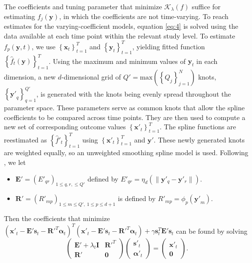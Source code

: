 \documentclass[11pt,reqno]{article}
\theoremstyle{definition}
\begin{document}
The coefficients and tuning parameter that minimize $\mathcal{K}_{\lambda}(f)$ suffice for estimating $f_{j}(\mathbf{y})$, in which the coefficients are not time-varying. To reach estimates for the varying-coefficient models, equation \ref{eq:4} is solved using the data available at each time point within the relevant study level. To estimate $f_p(\mathbf{y}, t)$, we use $\left\{\mathbf{x}_t\right\}_{t=1}^T$ and $\left\{\mathbf{y}_t\right\}_{t=1}^T$, yielding fitted function $\left\{\hat{f}_t(\mathbf{y})\right\}_{t=1}^T$. Using the maximum and minimum values of $\mathbf{y}_t$ in each dimension, a new $d$-dimensional grid of $Q' = \text{max}\left(\left\{Q_{j}\right\}_{j = 1}^{N}\right)$ knots, $\left\{\mathbf{y'}_q\right\}_{q=1}^{Q'}$, is generated with the knots being evenly spread throughout the parameter space. These parameters serve as common knots that allow the spline coefficients to be compared across time points. They are then used to compute a new set of corresponding outcome values $\left\{\mathbf{x}'_t\right\}_{t=1}^{T}$. The spline functions are reestimated as $\left\{\hat{f}'_t\right\}_{t=1}^{T}$ using $\left\{\mathbf{x}'_t\right\}_{t=1}^{T}$ and $\mathbf{y}'$. These newly generated knots are weighted equally, so an unweighted smoothing spline model is used. Following \cite{greenSilverman1994}, we let

\begin{itemize}
  \item $\mathbf{E}' = \left(E'_{qr}\right)_{1 \leq q, r, \leq Q'}$ defined by $E'_{qr} = \eta_{d}\left(\|\mathbf{y}'_{q} - \mathbf{y}'_{r}\|\right)$.
  \item $\mathbf{R}' = \left(R'_{mp}\right)_{1 \leq m \leq Q', \ 1 \leq p \leq d + 1}$ is defined by $R'_{mp} = \phi_p(\mathbf{y'}_{m})$.
\end{itemize}

Then the coefficients that minimize $\left(\mathbf{x}'_t - \mathbf{E}'\mathbf{s}_t - \mathbf{R}'^{T}\mathbf{\alpha}_t\right)^{T}\left(\mathbf{x}'_t - \mathbf{E}'\mathbf{s}_t - \mathbf{R}'^{T}\mathbf{\alpha}_t\right) + \gamma\mathbf{s}_t^{T}\mathbf{E}'\mathbf{s}_t$ can be found by solving 
\begin{equation}
  \left(
  \begin{array}{cc}
    \mathbf{E}' + \lambda_{t}\mathbf{I} & \mathbf{R}'^{T} \\
    \mathbf{R}' & \mathbf{0}
  \end{array}
  \right)\left(
  \begin{array}{c}
    \mathbf{s}'_t \\
    \mathbf{\alpha}'_t
  \end{array}
  \right) = \left(
  \begin{array}{c}
    \mathbf{x}'_t \\
    \mathbf{0}
  \end{array}
  \right). \label{eq:6}
\end{equation}
\end{document}
